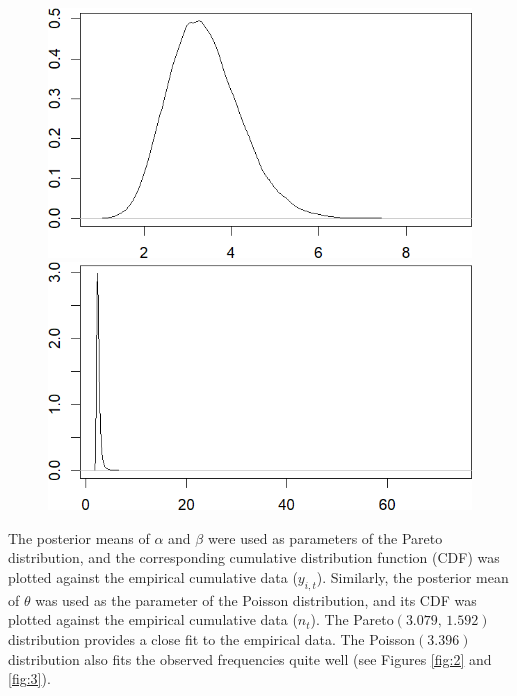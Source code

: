 \documentclass{Class/julia}
\begin{document}
\begin{figure}[!ht]
    \vspace{0.5cm}
    
    \begin{minipage}{0.45\textwidth}
        \centering
        \includegraphics[width=\textwidth]{rytgaard1990/density_theta.png}
        \subcaption{\( \theta \)}
    \end{minipage}%
    \hfill
    \begin{minipage}{0.45\textwidth}
        \centering
        \includegraphics[width=\textwidth]{rytgaard1990/density_E_y.png}
    \end{minipage}
    
\end{figure}

The posterior means of \( \alpha \) and \( \beta \) were used as parameters of the Pareto distribution, and the corresponding cumulative distribution function (CDF) was plotted against the empirical cumulative data (\( y_{i,t} \)). Similarly, the posterior mean of \( \theta \) was used as the parameter of the Poisson distribution, and its CDF was plotted against the empirical cumulative data (\( n_t \)). The Pareto\((3.079,\,1.592)\) distribution provides a close fit to the empirical data. The Poisson\((3.396)\) distribution also fits the observed frequencies quite well (see Figures \ref{fig:2} and \ref{fig:3}).
\end{document}
